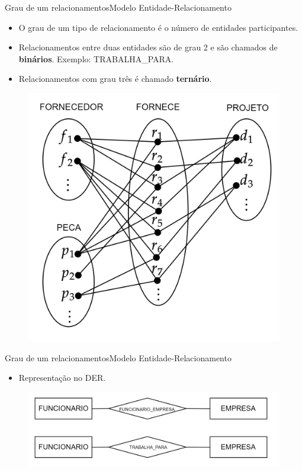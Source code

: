 \documentclass[t]{beamer}
\begin{document}
\begin{ftst}{Grau de um relacionamentos}{Modelo Entidade-Relacionamento}
\small
\begin{itemize}
    \item O grau de um tipo de relacionamento é o número de entidades participantes.
    \item Relacionamentos entre duas entidades são de grau 2 e são chamados de \textbf{binários}. Exemplo: TRABALHA\_PARA.
    \item Relacionamentos com grau três é chamado \textbf{ternário}.
\end{itemize}

\begin{figure}
    \centering
    \includegraphics[scale=0.12]{Figuras/01_9.png}
\end{figure}

\end{ftst}


\begin{ftst}{Grau de um relacionamentos}{Modelo Entidade-Relacionamento}
\begin{itemize}
    \item Representação no DER.
\end{itemize}
\vone
\begin{figure}
    \centering
    \includegraphics[scale=0.2]{Figuras/01_10.png}
\end{figure}

\end{ftst}
\end{document}
